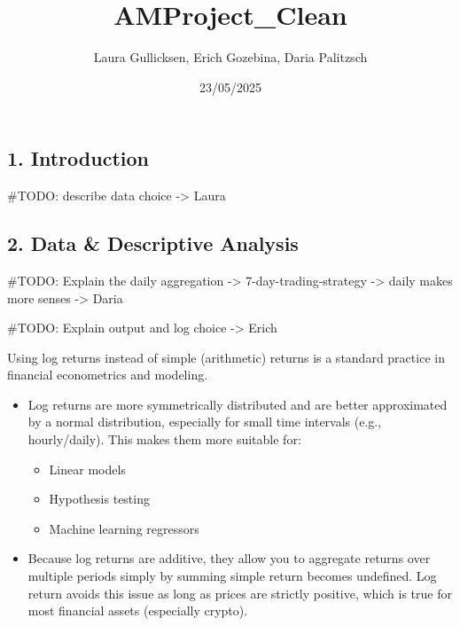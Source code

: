 \documentclass[
  12pt,
]{article}
\title{AMProject\_Clean}
\author{Laura Gullicksen, Erich Gozebina, Daria Palitzsch}
\date{23/05/2025}
\providecommand{\tightlist}{%
  \setlength{\itemsep}{0pt}\setlength{\parskip}{0pt}}
\begin{document}
\maketitle

\subsection{1. Introduction}\label{introduction}

\#TODO: describe data choice -\textgreater{} Laura

\subsection{2. Data \& Descriptive
Analysis}\label{data-descriptive-analysis}

\#TODO: Explain the daily aggregation -\textgreater{}
7-day-trading-strategy -\textgreater{} daily makes more senses
-\textgreater{} Daria

\#TODO: Explain output and log choice -\textgreater{} Erich

Using log returns instead of simple (arithmetic) returns is a standard
practice in financial econometrics and modeling.

\begin{itemize}
\tightlist
\item
  Log returns are more symmetrically distributed and are better
  approximated by a normal distribution, especially for small time
  intervals (e.g., hourly/daily). This makes them more suitable for:

  \begin{itemize}
  \tightlist
  \item
    Linear models
  \item
    Hypothesis testing
  \item
    Machine learning regressors
  \end{itemize}
\item
  Because log returns are additive, they allow you to aggregate returns
  over multiple periods simply by summing simple return becomes
  undefined. Log return avoids this issue as long as prices are strictly
  positive, which is true for most financial assets (especially crypto).
\end{itemize}
\end{document}
